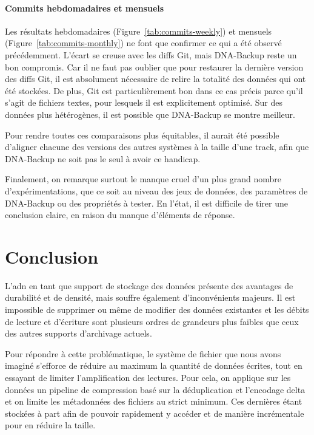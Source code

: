 \documentclass[a4paper]{report}
\begin{document}
\subsubsection{Commits hebdomadaires et mensuels}

Les résultats hebdomadaires (Figure~\ref{tab:commits-weekly}) et mensuels (Figure~\ref{tab:commits-monthly})
ne font que confirmer ce qui a été observé précédemment.
L'écart se creuse avec les diffs Git, mais DNA-Backup reste un bon compromis.
Car il ne faut pas oublier que pour restaurer la dernière version des diffs Git,
il est absolument nécessaire de relire la totalité des données qui ont été stockées.
De plus, Git est particulièrement bon dans ce cas précis
parce qu'il s'agit de fichiers textes,
pour lesquels il est explicitement optimisé.
Sur des données plus hétérogènes, il est possible que DNA-Backup se montre meilleur.

Pour rendre toutes ces comparaisons plus équitables,
il aurait été possible d'aligner chacune des versions
des autres systèmes à la taille d'une track,
afin que DNA-Backup ne soit pas le seul à avoir ce handicap.

Finalement, on remarque surtout le manque cruel d'un plus grand nombre d'expérimentations,
que ce soit au niveau des jeux de données, des paramètres de DNA-Backup ou des propriétés à tester.
En l'état, il est difficile de tirer une conclusion claire, en raison du manque d'éléments de réponse.


\chapter*{Conclusion}

L'\ac{adn} en tant que support de stockage des données présente des avantages de durabilité et de densité,
mais souffre également d'inconvénients majeurs.
Il est impossible de supprimer ou même de modifier des données existantes
et les débits de lecture et d'écriture sont plusieurs ordres de grandeurs
plus faibles que ceux des autres supports d'archivage actuels.

Pour répondre à cette problématique, le système de fichier que nous avons imaginé
s'efforce de réduire au maximum la quantité de données écrites,
tout en essayant de limiter l'amplification des lectures.
Pour cela, on applique sur les données un pipeline de compression basé sur la déduplication et l'encodage delta
et on limite les métadonnées des fichiers au strict minimum.
Ces dernières étant stockées à part afin de pouvoir rapidement y accéder
et de manière incrémentale pour en réduire la taille.
\end{document}
